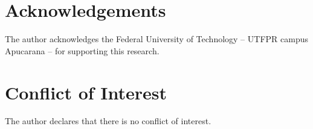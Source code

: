 \documentclass[english]{textolivre}
\begin{document}
\section*{Acknowledgements}
The author acknowledges the Federal University of Technology -- UTFPR
campus Apucarana -- for supporting this research.

\section*{Conflict of Interest}
The author declares that there is no conflict of interest.

\printbibliography\label{sec-bib}
\end{document}
